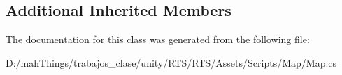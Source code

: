 \subsection*{Additional Inherited Members}


The documentation for this class was generated from the following file\+:\begin{DoxyCompactItemize}
\item 
D\+:/mah\+Things/trabajos\+\_\+clase/unity/\+R\+T\+S/\+R\+T\+S/\+Assets/\+Scripts/\+Map/Map.\+cs\end{DoxyCompactItemize}
